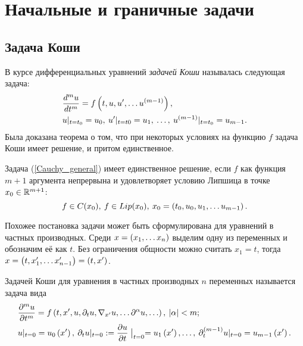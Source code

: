 \section{Начальные и граничные задачи}
\subsection{Задача Коши}
    В курсе дифференциальных уравнений \textit{задачей Коши} называлась следующая задача:
    \begin{align}
        & \frac{d^m u}{dt^m} = f\left({t, u, u',\ldots u^{(m-1)}}\right), \label{Cauchy_general} \\
        & u |_{t=t_0} = u_{0},\: u' |_{t = t0} = u_1,\:\ldots,\: u^{(m-1)} |_{t = t_0} = u_{m-1}. \notag
    \end{align}
    Была доказана теорема о том, что при некоторых условиях на функцию $f$ задача Коши имеет решение, и притом единственное.
    \begin{theorem}
        Задача (\ref{Cauchy_general}) имеет единственное решение, если $f$ как функция $m+1$ аргумента непрервына и удовлетворяет
        условию Липшица в точке $x_0 \in \mathbb{R}^{m+1}$:
        \begin{equation*}
            f \in C(x_0),\: f \in Lip(x_0),\: x_0 = \left({t_0, u_0, u_1,\ldots u_{m-1}}\right).
        \end{equation*}
    \end{theorem}

    Похожее постановка задачи может быть сформулирована для уравнений в частных производных. Среди $x = \left({x_1,\ldots x_n}\right)$
    выделим одну из переменных и обозначим её как $t$. Без ограничения общности можно считать $x_1 = t$, тогда $x = \left({t, x'_1,\ldots x'_{n-1}}\right) = \left({t, x'}\right)$.
    \begin{Def}
        Задачей Коши для уравнения в частных производных $n$ переменных называется задача вида
        \begin{align}
            & \frac{\partial^m u}{\partial t^m} = f\left({t, x', u, \partial_t u, \nabla_{x'} u, \ldots \partial^{\alpha} u,\ldots}\right),\: \left|{\alpha}\right| < m; \label{Caucy_partial}\\
            & u|_{t = 0} = u_0\left({x'}\right),\: \partial_t u|_{t=0} := \frac{\partial u}{\partial t} \bigm|_{t=0} = u_1\left({x'}\right),\ldots,\: \partial_t^{(m-1)} u|_{t=0} = u_{m-1}\left({x'}\right). \notag
        \end{align}
    \end{Def}

